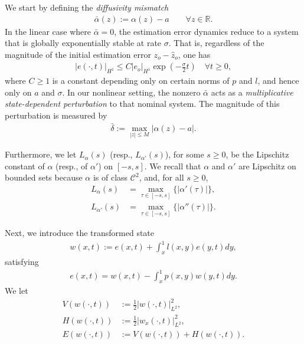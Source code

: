 \documentclass[twocolumn]{autart}
\begin{document}
We start by defining the \textit{diffusivity mismatch}
\begin{align}
\bar{\alpha}(z) := \alpha(z)-a \qquad \forall z\in \mathbb{R}. \label{mismatch_def}
\end{align}
In the linear case where $\bar{\alpha} = 0$, the estimation error dynamics reduce to a system that is globally exponentially stable at rate $\sigma$. That is, regardless of the magnitude of the initial estimation error $z_o-\hat{z}_o$, one has
\begin{align*}
|e(\cdot,t)|_{H^1}
\leq
C |e_o|_{H^1}
\exp\left(-\frac{\sigma}{2}t\right)
\quad \forall t\geq 0,
\end{align*}
where $C\geq 1$ is a constant depending only on certain norms of $p$ and $l$, and hence only on $a$ and $\sigma$. In our nonlinear setting, the nonzero $\bar{\alpha}$ acts as a \textit{multiplicative state-dependent perturbation} to that nominal system. The magnitude of this perturbation is measured by 
\begin{align}
\bar{\delta} := \max_{|z|\leq M} |\alpha(z)-a|. \label{delta_bar}
\end{align}

Furthermore, we let $L_{\alpha}(s)$ (resp., $L_{\alpha'}(s)$), for some $s\geq 0$, be the Lipschitz constant of $\alpha$ (resp., of $\alpha'$) on $[-s,s]$. We recall that $\alpha$ and $\alpha'$ are Lipschitz on bounded sets because $\alpha$ is of class $\mathscr{C}^2$, and, for all $s\geq 0$,
\begin{align}
L_{\alpha}(s) &= \max_{\tau \in [-s,s]}\{|\alpha'(\tau)|\}, \label{lipschitz1} \\
L_{\alpha'}(s) &= \max_{\tau \in [-s,s]}\{|\alpha''(\tau)|\}.\label{lipschitz2}
\end{align}

Next, we introduce the transformed state 
\begin{align}
w(x,t) := e(x,t) + \int_x^1l(x,y)e(y,t)dy, \label{inv_back}
\end{align}
satisfying 
\begin{align}
e(x,t) = w(x,t) - \int_x^1p(x,y)w(y,t)dy.\label{f_back}
\end{align}
We let 
\begin{align}
V(w(\cdot,t)) &:= \frac{1}{2}|w(\cdot,t)|_{L^2}^2, \\ 
H(w(\cdot,t)) &:= \frac{1}{2}|w_x(\cdot,t)|_{L^2}^2, \\
E(w(\cdot,t)) &:= V(w(\cdot,t))+H(w(\cdot,t)).
\end{align}
\end{document}
